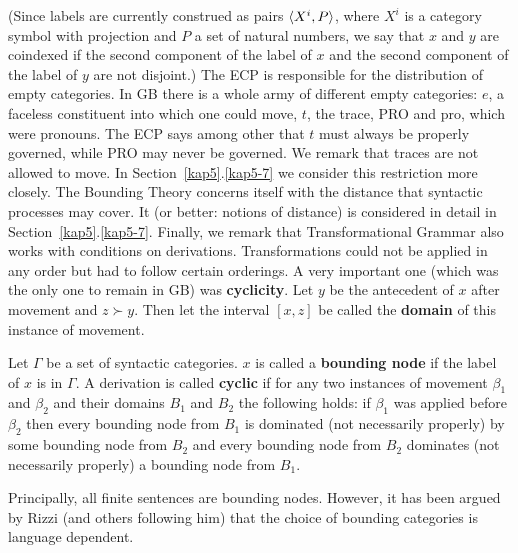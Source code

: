 (Since labels are currently construed as pairs $\langle X^i, P\rangle$,
where $X^i$ is a category symbol with projection and $P$ a set of
natural numbers, we say that $x$ and $y$ are coindexed if the
second component of the label of $x$ and the second component of
the label of $y$ are not disjoint.) The ECP is responsible for
the distribution of empty categories. In GB there is a whole army
of different empty categories: $e$, a faceless constituent
into which one could move, $t$, the trace, {\rm PRO} and {\rm
pro}, which were pronouns. The ECP says among other that $t$ must
always be properly governed, while  {\rm PRO} may never be
governed. We remark that traces are not allowed to move. In
Section~\ref{kap5}.\ref{kap5-7} we consider this restriction more closely.
The Bounding Theory concerns itself with the distance that
syntactic processes may cover. It (or better: notions of distance)
is considered in detail in Section~\ref{kap5}.\ref{kap5-7}. Finally, we
remark that Transformational Grammar also works with conditions on
derivations. Transformations could not be applied in any order but
had to follow certain orderings. A very important one (which was
the only one to remain in GB)
was \textbf{cyclicity}. Let $y$ be the antecedent of $x$ after
movement and $z \succ y$. Then let the interval $[x,z]$ be
called the \textbf{domain} of this instance of movement.
\begin{defn}
Let $\Gamma$ be a set of syntactic categories.  $x$ is called a
\textbf{bounding node} if the label of $x$ is in $\Gamma$. A
derivation is called \textbf{cyclic} if for any two instances of
movement $\beta_1$ and $\beta_2$ and their domains $B_1$ and $B_2$
the following holds: if $\beta_1$ was applied before $\beta_2$
then every bounding node from $B_1$ is dominated (not necessarily
properly) by some bounding node from $B_2$ and every bounding node
from $B_2$ dominates (not necessarily properly) a bounding node
from $B_1$.
\end{defn}
Principally, all finite sentences are bounding nodes. However, it
has been argued by Rizzi (and others following him) that the
choice of bounding categories is language dependent.

